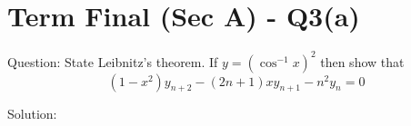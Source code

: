 \documentclass[11pt, a4paper]{article}
\begin{document}

\section*{Term Final (Sec A) - Q3(a)}

Question:
State Leibnitz's theorem. If $y = (\cos^{-1} x)^2$ then show that 
\[ (1-x^2)y_{n+2} - (2n+1)xy_{n+1} - n^2 y_n = 0 \]

Solution:
\end{document}
